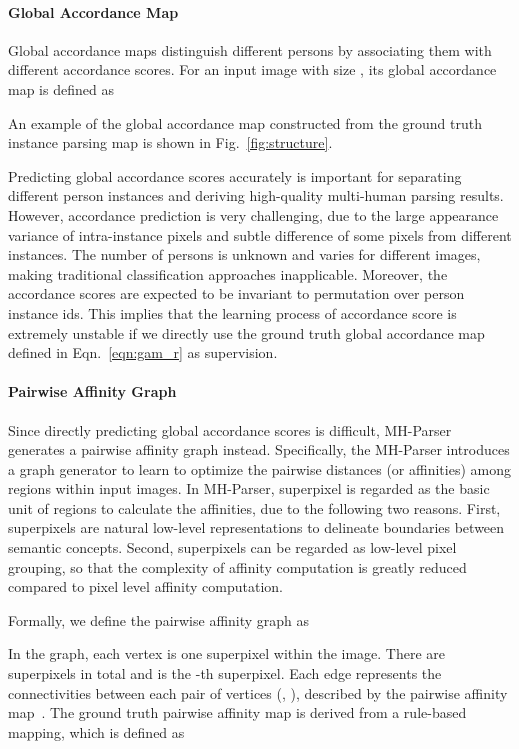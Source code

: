 \documentclass[10pt, letterpaper]{article}
\begin{document}
\paragraph{Global Accordance Map}
Global accordance maps distinguish different persons by associating them with different accordance scores. For an input image  with size , its global accordance map  is defined as 

An example of the global accordance map  constructed from the ground truth instance parsing map is shown in Fig.~\ref{fig:structure}. 

Predicting global accordance scores accurately is important for separating different person instances and deriving high-quality multi-human parsing results.  However, accordance prediction is very challenging, due to the large appearance variance of  intra-instance pixels and subtle difference of some pixels from different instances. The number of persons is unknown and varies for different images, making traditional classification approaches inapplicable. Moreover, the accordance scores are expected to be invariant to permutation over person instance ids. This implies that the learning process of accordance score is extremely unstable if we directly use the ground truth global accordance map defined in Eqn.~\eqref{eqn:gam_r} as supervision. 

\paragraph{Pairwise Affinity Graph}
Since directly predicting global accordance scores is difficult, MH-Parser generates a pairwise affinity graph instead. Specifically, the MH-Parser introduces a graph generator to learn to optimize the pairwise distances (or affinities) among regions within input images. In MH-Parser, superpixel is regarded as the basic unit of regions to calculate the affinities, due to the following two reasons. First, superpixels are natural low-level representations to delineate boundaries between semantic concepts. Second, superpixels can be regarded as low-level pixel grouping, so that the complexity of affinity computation is greatly reduced compared to pixel level affinity computation.

Formally, we define the pairwise affinity graph as 

In the graph, each vertex   is one superpixel within the image.  There are  superpixels in total and  is the -th superpixel. Each edge  represents the connectivities between each pair of vertices (, ), described by the pairwise affinity map~. The ground truth pairwise affinity map  is derived from a rule-based mapping, which is defined as 
\end{document}
